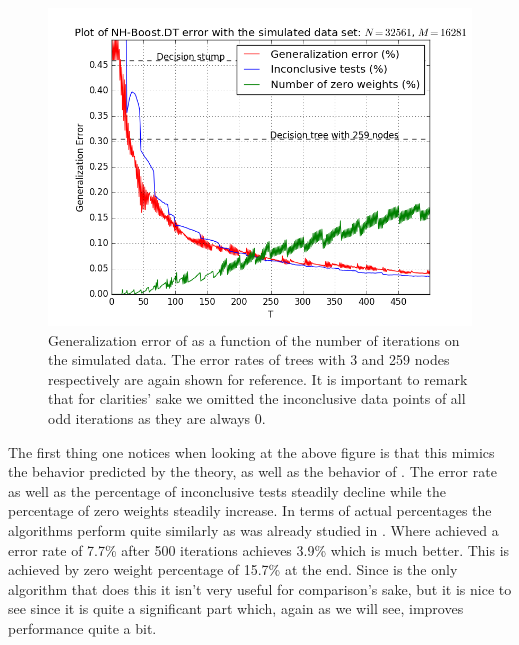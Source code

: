 \begin{figure}[!ht]
  \centering
      \includegraphics[width=\graphWidth]{generated/NHGD.png}
  \caption{Generalization error of \NHB as a function of the number of iterations on the simulated data. The error rates of trees with 3 and 259 nodes respectively are again shown for reference. It is important to remark that for clarities' sake we omitted the inconclusive data points of all odd iterations as they are always 0.}
      \label{fig:NHBGD}
\end{figure}
 \FloatBarrier
 \par The first thing one notices when looking at the above figure is that this mimics the behavior predicted by the theory, as well as the behavior of \adaB. The error rate as well as the percentage of inconclusive tests steadily decline while the percentage of zero weights steadily increase. In terms of actual percentages the algorithms perform quite similarly as was already studied in \cite{Luo2014}. Where \adaB achieved a error rate of 7.7\% after 500 iterations \NHB achieves 3.9\% which is much better. This is achieved by zero weight percentage of 15.7\% at the end. Since \NHB is the only algorithm that does this it isn't very useful for comparison's sake, but it is nice to see since it is quite a significant part which, again as we will see, improves performance quite a bit.  
